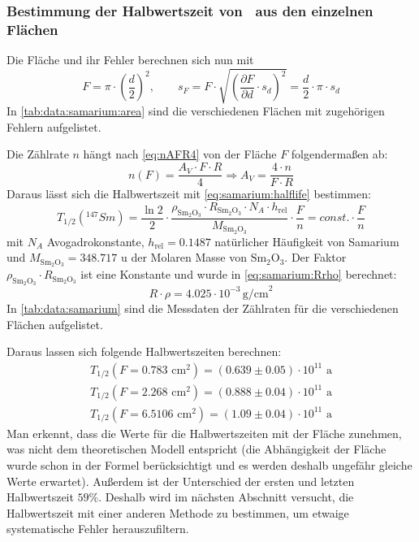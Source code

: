 \subsubsection{Bestimmung der Halbwertszeit von \samarium ~aus den einzelnen Flächen}
\label{subsub:samarium:halflife:single}
Die Fläche und ihr Fehler berechnen sich nun mit
\begin{equation}
  F = \pi  \cdot \left( \frac{d}{2} \right)^2 , \qquad 
  s_F = F \cdot \sqrt{ \left( \frac{\partial F}{\partial d} \cdot s_d \right)^2 } = \frac{d}{2} \cdot \pi \cdot s_d
\end{equation}
In \autoref{tab:data:samarium:area} sind die verschiedenen Flächen mit zugehörigen Fehlern aufgelistet.

Die Zählrate $n$ hängt nach \autoref{eq:nAFR4} von der Fläche $F$ folgendermaßen ab:
\begin{equation}
\label{eq:samarium:counts_eval}
  n(F) = \frac{A_V \cdot F \cdot R}{4} \Rightarrow A_V = \frac{4 \cdot n}{F \cdot R}
\end{equation}
Daraus lässt sich die Halbwertszeit mit \autoref{eq:samarium:halflife} bestimmen:
\begin{equation}
  \label{eq:samarium:halflife_eval}
  T_{1/2}({}^{147}Sm) = \frac{\ln 2}{2} \cdot
      \frac{\rho_{\text{Sm}_2\text{O}_3} \cdot R_{\text{Sm}_2\text{O}_3} \cdot N_A \cdot h_{\text{rel}}}{M_{\text{Sm}_2\text{O}_3}} 
  	  \cdot \frac{F}{n} = const. \cdot \frac{F}{n}
\end{equation}
mit $N_A$ Avogadrokonstante, $h_{\text{rel}} = 0.1487$ natürlicher Häufigkeit von Samarium und $M_{\text{Sm}_2\text{O}_3} = 348.717$ u der 
Molaren Masse von $\text{Sm}_2\text{O}_3$.
Der Faktor $\rho_{\text{Sm}_2\text{O}_3} \cdot R_{\text{Sm}_2\text{O}_3}$ ist eine Konstante und wurde in \autoref{eq:samarium:Rrho} berechnet:
\begin{equation}
  R \cdot \rho = 4.025 \cdot 10^{-3} \, \text{g/cm}^2
\end{equation}
In \autoref{tab:data:samarium} sind die Messdaten der Zählraten für die verschiedenen Flächen aufgelistet.

Daraus lassen sich folgende Halbwertszeiten berechnen:
\begin{gather}
  T_{1/2}(F=0.783 \text{ cm}^2) = (0.639 \pm 0.05)\cdot 10^{11} \text{ a} \\
  T_{1/2}(F=2.268 \text{ cm}^2) = (0.888 \pm 0.04)\cdot 10^{11} \text{ a}\\
  T_{1/2}(F=6.5106 \text{ cm}^2) = (1.09 \pm 0.04)\cdot 10^{11} \text{ a}
\end{gather}
Man erkennt, dass die Werte für die Halbwertszeiten mit der Fläche zunehmen, was nicht dem theoretischen Modell entspricht (die Abhängigkeit der 
Fläche wurde schon in der Formel berücksichtigt und es werden deshalb ungefähr gleiche Werte erwartet). Außerdem ist der Unterschied der ersten und letzten 
Halbwertszeit $59\%$. Deshalb wird im nächsten Abschnitt versucht, die Halbwertszeit mit einer anderen Methode zu bestimmen, 
um etwaige systematische Fehler herauszufiltern.

